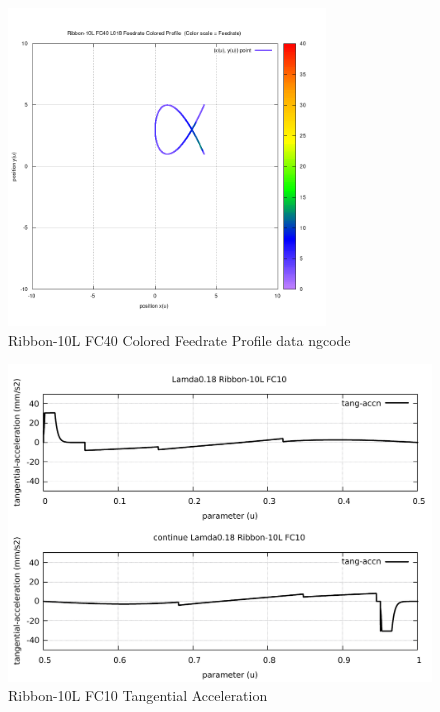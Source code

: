 \begin{figure}
	\caption     {Ribbon-10L FC40 Colored Feedrate Profile data ngcode}
	\label{20-img-Ribbon-10L-FC40-Colored-Feedrate-Profile-data_ngcode.png}
\includegraphics[width=0.75\textwidth]{Chap4/appendix/app-Ribbon-10L/plots/20-img-Ribbon-10L-FC40-Colored-Feedrate-Profile-data_ngcode.png}
\end{figure}

\clearpage
\pagebreak

\begin{figure}
	\caption     {Ribbon-10L FC10 Tangential Acceleration}
	\label{21-img-Ribbon-10L-FC10-Tangential-Acceleration.pdf}
\includegraphics[width=1.00\textwidth]{Chap4/appendix/app-Ribbon-10L/plots/21-img-Ribbon-10L-FC10-Tangential-Acceleration.pdf}
\end{figure}



